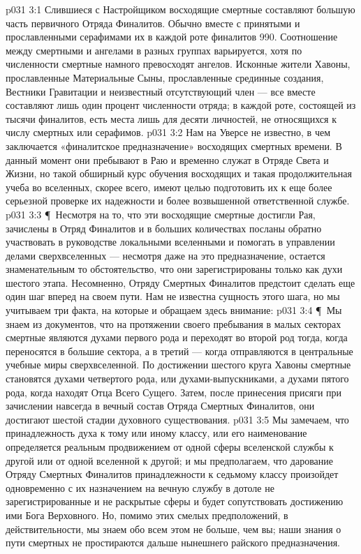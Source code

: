 \vs p031 3:1 Слившиеся с Настройщиком восходящие смертные составляют большую часть первичного Отряда Финалитов. Обычно вместе с принятыми и прославленными серафимами их в каждой роте финалитов 990. Соотношение между смертными и ангелами в разных группах варьируется, хотя по численности смертные намного превосходят ангелов. Исконные жители Хавоны, прославленные Материальные Сыны, прославленные срединные создания, Вестники Гравитации и неизвестный отсутствующий член --- все вместе составляют лишь один процент численности отряда; в каждой роте, состоящей из тысячи финалитов, есть места лишь для десяти личностей, не относящихся к числу смертных или серафимов.
\vs p031 3:2 Нам на Уверсе не известно, в чем заключается «финалитское предназначение» восходящих смертных времени. В данный момент они пребывают в Раю и временно служат в Отряде Света и Жизни, но такой обширный курс обучения восходящих и такая продолжительная учеба во вселенных, скорее всего, имеют целью подготовить их к еще более серьезной проверке их надежности и более возвышенной ответственной службе.
\vs p031 3:3 \P\ Несмотря на то, что эти восходящие смертные достигли Рая, зачислены в Отряд Финалитов и в больших количествах посланы обратно участвовать в руководстве локальными вселенными и помогать в управлении делами сверхвселенных --- несмотря даже на это  предназначение, остается знаменательным то обстоятельство, что они зарегистрированы только как духи шестого этапа. Несомненно, Отряду Смертных Финалитов предстоит сделать еще один шаг вперед на своем пути. Нам не известна сущность этого шага, но мы учитываем три факта, на которые и обращаем здесь внимание:
\vs p031 3:4 \P\ \bibnobreakspace Мы знаем из документов, что на протяжении своего пребывания в малых секторах смертные являются духами первого рода и переходят во второй род тогда, когда переносятся в большие сектора, а в третий --- когда отправляются в центральные учебные миры сверхвселенной. По достижении шестого круга Хавоны смертные становятся духами четвертого рода, или духами\hyp{}выпускниками, а духами пятого рода, когда находят Отца Всего Сущего. Затем, после принесения присяги при зачислении навсегда в вечный состав Отряда Смертных Финалитов, они достигают шестой стадии духовного существования.
\vs p031 3:5 Мы замечаем, что принадлежность духа к тому или иному классу, или его наименование определяется реальным продвижением от одной сферы вселенской службы к другой или от одной вселенной к другой; и мы предполагаем, что дарование Отряду Смертных Финалитов принадлежности к седьмому классу произойдет одновременно с их назначением на вечную службу в дотоле не зарегистрированные и не раскрытые сферы и будет сопутствовать достижению ими Бога Верховного. Но, помимо этих смелых предположений, в действительности, мы знаем обо всем этом не больше, чем вы; наши знания о пути смертных не простираются дальше нынешнего райского предназначения.
